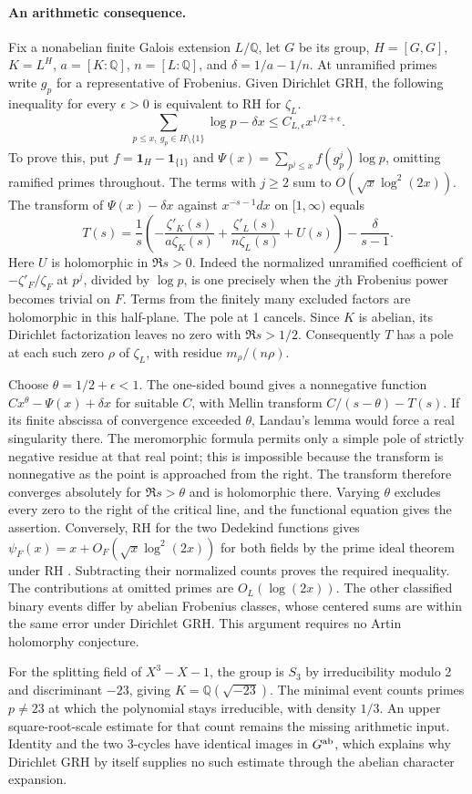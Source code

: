 \paragraph{An arithmetic consequence.}
Fix a nonabelian finite Galois extension $L/\mathbb Q$, let $G$ be its group, $H=[G,G]$, $K=L^H$, $a=[K:\mathbb Q]$, $n=[L:\mathbb Q]$, and $\delta=1/a-1/n$. At unramified primes write $g_p$ for a representative of Frobenius. Given Dirichlet GRH, the following inequality for every $\epsilon>0$ is equivalent to RH for $\zeta_L$.
\[
 \sum_{p\le x,\ g_p\in H\setminus\{1\}}\log p-\delta x
 \le C_{L,\epsilon} x^{1/2+\epsilon}.
\]
To prove this, put $f=\mathbf1_H-\mathbf1_{\{1\}}$ and
$\Psi(x)=\sum_{p^j\le x} f(g_p^j)\log p$, omitting ramified primes throughout. The terms with $j\ge2$ sum to $O(\sqrt x\log^2(2x))$. The transform of $\Psi(x)-\delta x$ against $x^{-s-1}dx$ on $[1,\infty)$ equals
\[
 T(s)=\frac1s\left(-\frac{\zeta'_K(s)}{a\zeta_K(s)}
                   +\frac{\zeta'_L(s)}{n\zeta_L(s)}+U(s)\right)
                  -\frac{\delta}{s-1}.
\]
Here $U$ is holomorphic in $\Re s>0$. Indeed the normalized unramified coefficient of $-\zeta'_F/\zeta_F$ at $p^j$, divided by $\log p$, is one precisely when the $j$th Frobenius power becomes trivial on $F$. Terms from the finitely many excluded factors are holomorphic in this half-plane. The pole at 1 cancels. Since $K$ is abelian, its Dirichlet factorization leaves no zero with $\Re s>1/2$. Consequently $T$ has a pole at each such zero $\rho$ of $\zeta_L$, with residue $m_\rho/(n\rho)$.

Choose $\theta=1/2+\epsilon<1$. The one-sided bound gives a nonnegative function $C x^\theta-\Psi(x)+\delta x$ for suitable $C$, with Mellin transform $C/(s-\theta)-T(s)$. If its finite abscissa of convergence exceeded $\theta$, Landau's lemma would force a real singularity there. The meromorphic formula permits only a simple pole of strictly negative residue at that real point; this is impossible because the transform is nonnegative as the point is approached from the right. The transform therefore converges absolutely for $\Re s>\theta$ and is holomorphic there. Varying $\theta$ excludes every zero to the right of the critical line, and the functional equation gives the assertion. Conversely, RH for the two Dedekind functions gives $\psi_F(x)=x+O_F(\sqrt x\log^2(2x))$ for both fields by the prime ideal theorem under RH \cite{gm}. Subtracting their normalized counts proves the required inequality. The contributions at omitted primes are $O_L(\log(2x))$. The other classified binary events differ by abelian Frobenius classes, whose centered sums are within the same error under Dirichlet GRH. This argument requires no Artin holomorphy conjecture.

For the splitting field of $X^3-X-1$, the group is $S_3$ by irreducibility modulo 2 and discriminant $-23$, giving $K=\mathbb Q(\sqrt{-23})$. The minimal event counts primes $p\ne23$ at which the polynomial stays irreducible, with density $1/3$. An upper square-root-scale estimate for that count remains the missing arithmetic input. Identity and the two 3-cycles have identical images in $G^{\rm ab}$, which explains why Dirichlet GRH by itself supplies no such estimate through the abelian character expansion.
